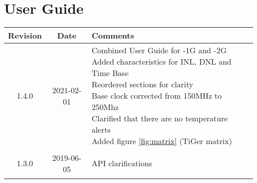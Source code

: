 \section{User Guide}
\begin{tabularx}{\textwidth}{|c|c|X|}
    \hline
    Revision & Date & Comments \\
    \hline\hline
    \hypertarget{ugrev}{1.4.0} & 2021-02-01 & 
    \makecell[l]{
        Combined User Guide for -1G and -2G \\
        Added characteristics for INL, DNL and Time Base \\
        Reordered sections for clarity \\
        Base clock corrected from 150MHz to 250Mhz \\
        Clarified that there are no temperature alerts \\
        Added figure \ref{fig:matrix} (TiGer matrix)
    }\\
    \hline
    \hypertarget{ugrev}{1.3.0} & 2019-06-05 & API clarifications \\
    \hline
\end{tabularx} 